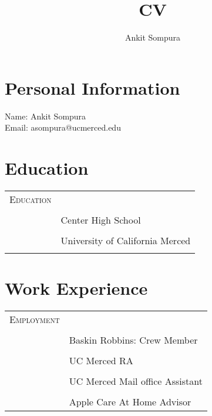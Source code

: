 \documentclass[11pt]{article}
\title{CV}
\author{Ankit Sompura}
\begin{document}
\maketitle

\section{Personal Information}


Name: Ankit Sompura\\
Email: asompura@ucmerced.edu

\section{Education}

\begin{tabular}{p{2in} p{4.15in}}
    \textsc{Education}\\\\ &  Center High School\\\\
    & University of California Merced\\\\
\end{tabular}


\section{Work Experience}
\begin{tabular}{p{2in}p{4.15in}}
  \textsc{Employment}\\\\ & Baskin Robbins: Crew Member\\\\
    & UC Merced RA\\\\ & UC Merced Mail office Assistant\\\\ & Apple Care At Home Advisor

\end{tabular}
\end{document}
